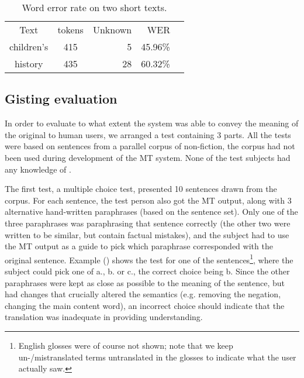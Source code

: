 \documentclass{book}
\begin{document}
\begin{table}
  \begin{center}
  \begin{tabular}{ccrrr}
   Text       & tokens & Unknown & WER  \\
   children's & 415     & 5      & 45.96\% \\
   history    & 435     & 28     & 60.32\%  \\
  \end{tabular}
    \caption{Word error rate on two short texts.}
    \label{table:wer}
  \end{center}
\end{table}


\subsection{Gisting evaluation}
  
In order to evaluate to what extent the system was able to convey the
meaning of the original to human users, we arranged a test containing
3 parts. All the tests were based on sentences from a parallel corpus
of non-fiction, the corpus had not been used during development of the
MT system. None of the test subjects had any knowledge of \sme{}.

The first test, a multiple choice test, presented 10 \sme{} sentences
drawn from the corpus. For each sentence, the test person also got the
MT output, along with 3 alternative hand-written \nob{} paraphrases
(based on the \sme{} sentence set). Only one of the three paraphrases
was paraphrasing that \sme{} sentence correctly (the other two were
written to be similar, but contain factual mistakes), and the subject
had to use the MT output as a guide to pick which paraphrase
corresponded with the original \sme{} sentence. Example () shows
the test for one of the sentences\footnote{English glosses were of
  course not shown; note that we keep un-/mistranslated terms
  untranslated in the glosses to indicate what the user actually
  saw.}, where the subject could pick one of a., b. or c., the correct
choice being b. Since the other paraphrases were kept as close as
possible to the meaning of the \sme{} sentence, but had changes that
crucially altered the semantics (e.g. removing the negation, changing
the main content word), an incorrect choice should indicate that the
translation was inadequate in providing understanding.

\end{document}

